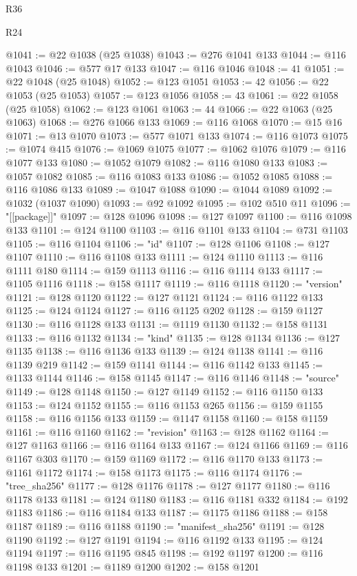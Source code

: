 \begin{lexlean}{R36}
\begin{lexlean}{R24}
\begin{coremodule}
{{{{{{{{{{{{{{{{{{{{{{{{{{{{{{{{{{{{{{{{{{{{{{{{{{{{{{{{{{{{{{{{{{{{{{{{{{{{{{{{{{{{{{{{{{{{{{{{{{{{{{{{{{{{{{{{{{{{{{{{{{{{{{{{{{{{{{{{{{{{{{{{{{{{{{{{{{{{{{{{{{{{{{{{{{{{{{{{{{{{{{{{{{{{{{{{{{{@1041 := @22 @1038 (@25 @1038)
@1043 := @276 @1041 @133
@1044 := @116 @1043
@1046 := @577 @17 @133
@1047 := @116 @1046
@1048 := 41
@1051 := @22 @1048 (@25 @1048)
@1052 := @123 @1051
@1053 := 42
@1056 := @22 @1053 (@25 @1053)
@1057 := @123 @1056
@1058 := 43
@1061 := @22 @1058 (@25 @1058)
@1062 := @123 @1061
@1063 := 44
@1066 := @22 @1063 (@25 @1063)
@1068 := @276 @1066 @133
@1069 := @116 @1068
@1070 := @15 @16
@1071 := @13 @1070
@1073 := @577 @1071 @133
@1074 := @116 @1073
@1075 := @1074 @415
@1076 := @1069 @1075
@1077 := @1062 @1076
@1079 := @116 @1077 @133
@1080 := @1052 @1079
@1082 := @116 @1080 @133
@1083 := @1057 @1082
@1085 := @116 @1083 @133
@1086 := @1052 @1085
@1088 := @116 @1086 @133
@1089 := @1047 @1088
@1090 := @1044 @1089
@1092 := @1032 (@1037 @1090)
@1093 := @92 @1092
@1095 := @102 @510 @11
@1096 := "[[package]]"
@1097 := @128 @1096
@1098 := @127 @1097
@1100 := @116 @1098 @133
@1101 := @124 @1100
@1103 := @116 @1101 @133
@1104 := @731 @1103
@1105 := @116 @1104
@1106 := "id"
@1107 := @128 @1106
@1108 := @127 @1107
@1110 := @116 @1108 @133
@1111 := @124 @1110
@1113 := @116 @1111 @180
@1114 := @159 @1113
@1116 := @116 @1114 @133
@1117 := @1105 @1116
@1118 := @158 @1117
@1119 := @116 @1118
@1120 := "version"
@1121 := @128 @1120
@1122 := @127 @1121
@1124 := @116 @1122 @133
@1125 := @124 @1124
@1127 := @116 @1125 @202
@1128 := @159 @1127
@1130 := @116 @1128 @133
@1131 := @1119 @1130
@1132 := @158 @1131
@1133 := @116 @1132
@1134 := "kind"
@1135 := @128 @1134
@1136 := @127 @1135
@1138 := @116 @1136 @133
@1139 := @124 @1138
@1141 := @116 @1139 @219
@1142 := @159 @1141
@1144 := @116 @1142 @133
@1145 := @1133 @1144
@1146 := @158 @1145
@1147 := @116 @1146
@1148 := "source"
@1149 := @128 @1148
@1150 := @127 @1149
@1152 := @116 @1150 @133
@1153 := @124 @1152
@1155 := @116 @1153 @265
@1156 := @159 @1155
@1158 := @116 @1156 @133
@1159 := @1147 @1158
@1160 := @158 @1159
@1161 := @116 @1160
@1162 := "revision"
@1163 := @128 @1162
@1164 := @127 @1163
@1166 := @116 @1164 @133
@1167 := @124 @1166
@1169 := @116 @1167 @303
@1170 := @159 @1169
@1172 := @116 @1170 @133
@1173 := @1161 @1172
@1174 := @158 @1173
@1175 := @116 @1174
@1176 := "tree_sha256"
@1177 := @128 @1176
@1178 := @127 @1177
@1180 := @116 @1178 @133
@1181 := @124 @1180
@1183 := @116 @1181 @332
@1184 := @192 @1183
@1186 := @116 @1184 @133
@1187 := @1175 @1186
@1188 := @158 @1187
@1189 := @116 @1188
@1190 := "manifest_sha256"
@1191 := @128 @1190
@1192 := @127 @1191
@1194 := @116 @1192 @133
@1195 := @124 @1194
@1197 := @116 @1195 @845
@1198 := @192 @1197
@1200 := @116 @1198 @133
@1201 := @1189 @1200
@1202 := @158 @1201
}}}}}}}}}}}}}}}}}}}}}}}}}}}}}}}}}}}}}}}}}}}}}}}}}}}}}}}}}}}}}}}}}}}}}}}}}}}}}}}}}}}}}}}}}}}}}}}}}}}}}}}}}}}}}}}}}}}}}}}}}}}}}}}}}}}}}}}}}}}}}}}}}}}}}}}}}}}}}}}}}}}}}}}}}}}}}}}}}}}}}}}}}}}}}}}}}}}
\end{coremodule}
\end{lexlean}
\end{lexlean}

